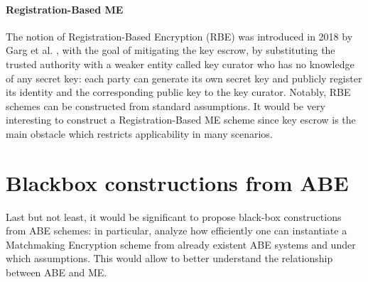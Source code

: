 \paragraph{Registration-Based ME}
The notion of Registration-Based Encryption (RBE) was introduced in 2018 by Garg et al. \cite{Garg}, with the goal of mitigating the key escrow, by substituting the trusted authority with a weaker entity called key curator who has no knowledge of any secret key: each party can generate its own secret key and publicly register its identity and the corresponding public key to the key curator. Notably, RBE schemes can be constructed from standard assumptions.
It would be very interesting to construct a Registration-Based ME scheme since key escrow is the main obstacle which restricts applicability in many scenarios.

\section{Blackbox constructions from ABE}
Last but not least, it would be significant to propose black-box constructions from ABE schemes: in particular, analyze how efficiently one can instantiate a Matchmaking Encryption scheme from already existent ABE systems and under which assumptions.
This would allow to better understand the relationship between ABE and ME.

